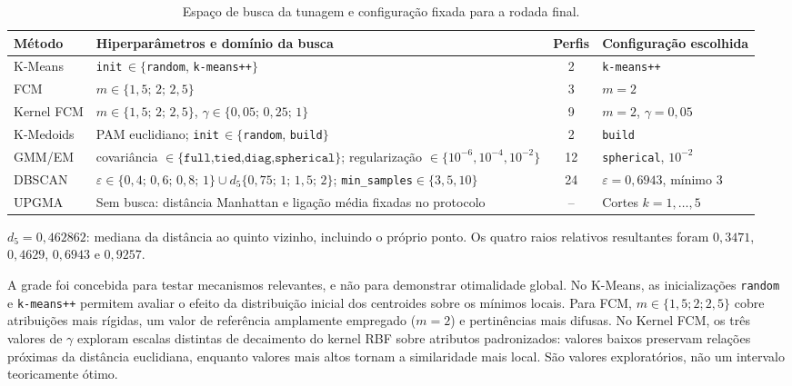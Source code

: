 \documentclass[conference,a4paper]{IEEEtran}
\begin{document}
\begin{table}[!t]
\caption{Espaço de busca da tunagem e configuração fixada para a rodada final.}
\label{tab:grade}
\centering\footnotesize
\begin{tabularx}{\textwidth}{@{}lYcl@{}}
\toprule
Método & Hiperparâmetros e domínio da busca & Perfis & Configuração escolhida\\
\midrule
K-Means & \texttt{init}\,$\in\{$\texttt{random}, \texttt{k-means++}$\}$ & 2 & \texttt{k-means++}\\
FCM & $m\in\{1{,}5;\,2;\,2{,}5\}$ & 3 & $m=2$\\
Kernel FCM & $m\in\{1{,}5;\,2;\,2{,}5\}$, $\gamma\in\{0{,}05;\,0{,}25;\,1\}$ & 9 & $m=2$, $\gamma=0{,}05$\\
K-Medoids & PAM euclidiano; \texttt{init}\,$\in\{$\texttt{random}, \texttt{build}$\}$ & 2 & \texttt{build}\\
GMM/EM & covariância $\in\{\texttt{full,tied,diag,spherical}\}$; regularização $\in\{10^{-6},10^{-4},10^{-2}\}$ & 12 & \texttt{spherical}, $10^{-2}$\\
DBSCAN & $\varepsilon\in\{0{,}4;\,0{,}6;\,0{,}8;\,1\}\cup d_5\{0{,}75;\,1;\,1{,}5;\,2\}$; \texttt{min\_samples}$\in\{3,5,10\}$ & 24 & $\varepsilon=0{,}6943$, mínimo 3\\
UPGMA & Sem busca: distância Manhattan e ligação média fixadas no protocolo & -- & Cortes $k=1,\ldots,5$\\
\bottomrule
\end{tabularx}
\vspace{1mm}\parbox{\textwidth}{\footnotesize $d_5=0{,}462862$: mediana da distância ao quinto vizinho, incluindo o próprio ponto. Os quatro raios relativos resultantes foram $0{,}3471$, $0{,}4629$, $0{,}6943$ e $0{,}9257$.}
\end{table}

A grade foi concebida para testar mecanismos relevantes, e não para demonstrar otimalidade global. No K-Means, as inicializações \texttt{random} e \texttt{k-means++} permitem avaliar o efeito da distribuição inicial dos centroides sobre os mínimos locais. Para FCM, $m\in\{1{,}5;2;2{,}5\}$ cobre atribuições mais rígidas, um valor de referência amplamente empregado ($m=2$) e pertinências mais difusas. No Kernel FCM, os três valores de $\gamma$ exploram escalas distintas de decaimento do kernel RBF sobre atributos padronizados: valores baixos preservam relações próximas da distância euclidiana, enquanto valores mais altos tornam a similaridade mais local. São valores exploratórios, não um intervalo teoricamente ótimo.
\end{document}
